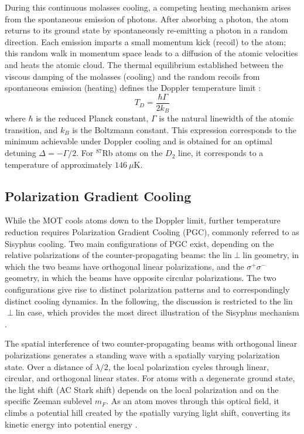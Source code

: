 During this continuous molasses cooling, a competing heating mechanism arises from the spontaneous emission of photons. After absorbing a photon, the atom returns to its ground state by spontaneously re-emitting a photon in a random direction. Each emission imparts a small momentum kick (recoil) to the atom; this random walk in momentum space leads to a diffusion of the atomic velocities and heats the atomic cloud. The thermal equilibrium established between the viscous damping of the molasses (cooling) and the random recoils from spontaneous emission (heating) defines the Doppler temperature limit \cite{Metcalf99}:
\begin{equation}
    T_D = \frac{\hbar \Gamma}{2 k_B}
    \label{eq:doppler_limit}
\end{equation}
where $\hbar$ is the reduced Planck constant, $\Gamma$ is the natural linewidth of the atomic transition, and $k_B$ is the Boltzmann constant. This expression corresponds to the minimum achievable under Doppler cooling and is obtained for an optimal detuning $\Delta = -\Gamma/2$. For $^{87}$Rb atoms on the $D_2$ line, it corresponds to a temperature of approximately $146~\mu\text{K}$.

\subsection{Polarization Gradient Cooling}

While the MOT cools atoms down to the Doppler limit, further temperature reduction requires Polarization Gradient Cooling (PGC), commonly referred to as Sisyphus cooling. Two main configurations of PGC exist, depending on the relative polarizations of the counter-propagating beams: the lin$\perp$lin geometry, in which the two beams have orthogonal linear polarizations, and the $\sigma^+\sigma^-$ geometry, in which the beams have opposite circular polarizations. The two configurations give rise to distinct polarization patterns and to correspondingly distinct cooling dynamics. In the following, the discussion is restricted to the lin$\perp$lin case, which provides the most direct illustration of the Sisyphus mechanism \cite{Dalibard89}.

The spatial interference of two counter-propagating beams with orthogonal linear polarizations generates a standing wave with a spatially varying polarization state. Over a distance of $\lambda/2$, the local polarization cycles through linear, circular, and orthogonal linear states. For atoms with a degenerate ground state, the light shift (AC Stark shift) depends on the local polarization and on the specific Zeeman sublevel $m_F$. As an atom moves through this optical field, it climbs a potential hill created by the spatially varying light shift, converting its kinetic energy into potential energy \cite{Dalibard89}.

